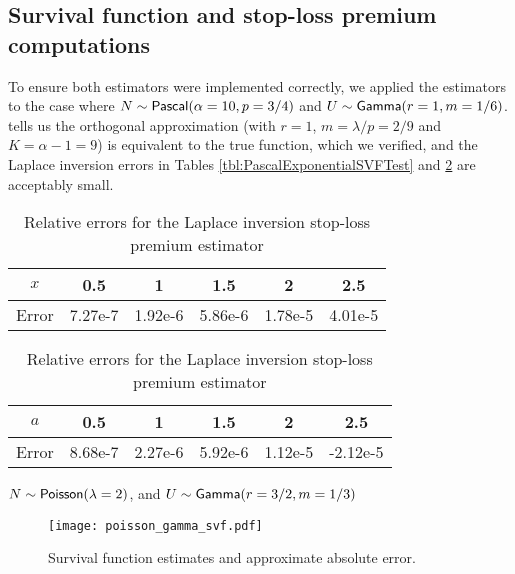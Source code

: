 \newpage
\subsection{Survival function and stop-loss premium computations}

\label{subsec:NumericsSurvivalFunctionStopLoss}

To ensure both estimators were implemented correctly, we applied the estimators to the case where $N\sim\mathsf{Pascal}(\alpha=10,p=3/4)$ and $U\sim\mathsf{Gamma}(r=1,m=1/6)$.  tells us the orthogonal approximation (with $r=1$, $m=\lambda/p=2/9$ and $K = \alpha-1 = 9$) is equivalent to the true function, which we verified, and the Laplace inversion errors in Tables \ref{tbl:PascalExponentialSVFTest} and \ref{tbl:PascalExponentialSLPTest} are acceptably small.

\begin{table}[H]
\centering
\caption{Relative errors for the Laplace inversion survival function estimator} \vspace{1em}
\begin{tabular}{c|ccccc}
$x$                   & 0.5  & 1  & 1.5  & 2 & 2.5  \\
\hline
Error & 7.27e-7 & 1.92e-6 & 5.86e-6 & 1.78e-5 & 4.01e-5 \\
\end{tabular}
\label{tbl:PascalExponentialSVFTest}

\caption{Relative errors for the Laplace inversion stop-loss premium estimator} \vspace{1em}
\begin{tabular}{c|ccccc}
$a$                   & 0.5  & 1  & 1.5  & 2 & 2.5  \\
\hline
Error & 8.68e-7 & 2.27e-6 & 5.92e-6 & 1.12e-5 & -2.12e-5 \\
\end{tabular}

\label{tbl:PascalExponentialSLPTest}
\end{table}

\begin{test}
$N\sim\mathsf{Poisson}(\lambda=2)$, and $U\sim\mathsf{Gamma}(r=3/2,m=1/3)$
\end{test}

\begin{figure}[H]
\centering
\texttt{[image: poisson\_gamma\_svf.pdf]}
\caption{Survival function estimates and approximate absolute error.}
\end{figure}

